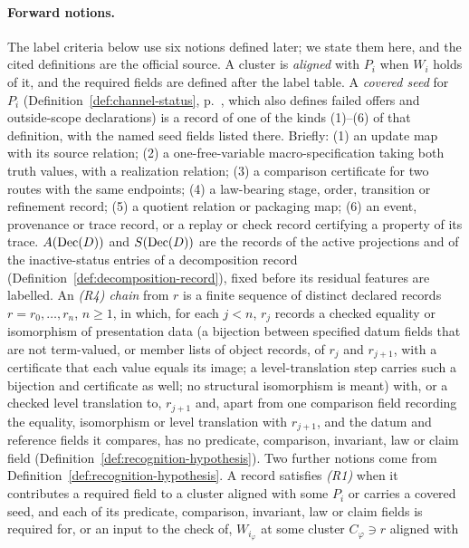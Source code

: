 \paragraph{Forward notions.} The label criteria below use six notions
defined later; we state them here, and the cited definitions are the official
source. A cluster is \emph{aligned} with \(P_i\) when \(W_i\) holds of it, and
the required fields are defined after the label table. A \emph{covered seed}
for \(P_i\) (Definition~\ref{def:channel-status}, p.~\pageref{def:channel-status}, which also defines failed offers and outside-scope declarations) is a record of one of the
kinds (1)--(6) of that definition, with the named seed fields listed there.
Briefly: (1) an update map with its source relation; (2) a one-free-variable
macro-specification taking both truth values, with a realization relation;
(3) a comparison certificate for two routes with the same endpoints; (4) a
law-bearing stage, order, transition or refinement record; (5) a quotient
relation or packaging map; (6) an event, provenance or trace record, or a
replay or check record certifying a property of its trace. \(A(\operatorname{Dec}\!\left(D\right))\) and \(S(\operatorname{Dec}\!\left(D\right))\) are the records of
the active projections and of the inactive-status entries of a decomposition
record (Definition~\ref{def:decomposition-record}), fixed before its residual
features are labelled. An \emph{(R4) chain} from \(r\) is a finite sequence of
distinct declared records \(r=r_0,\ldots,r_n\), \(n\ge1\), in which, for each
\(j<n\), \(r_j\) records a checked equality or isomorphism of presentation data (a bijection between specified datum fields that are not term-valued, or member lists of object records, of \(r_j\) and \(r_{j+1}\), with a certificate that each value equals its image; a level-translation step carries such a bijection and certificate as well; no structural isomorphism is meant) with,
or a checked level translation to, \(r_{j+1}\) and, apart from one comparison field recording the equality, isomorphism or level translation with \(r_{j+1}\), and the datum and reference fields it compares, has no predicate, comparison, invariant, law or claim field (Definition~\ref{def:recognition-hypothesis}).
Two further notions come from Definition~\ref{def:recognition-hypothesis}. A
record satisfies \emph{(R1)} when it contributes a required field to a cluster
aligned with some \(P_i\) or carries a covered seed, and each of its predicate,
comparison, invariant, law or claim fields is required for, or an input to the
check of, \(W_{i_\varphi}\) at some cluster \(C_\varphi\ni r\) aligned with
